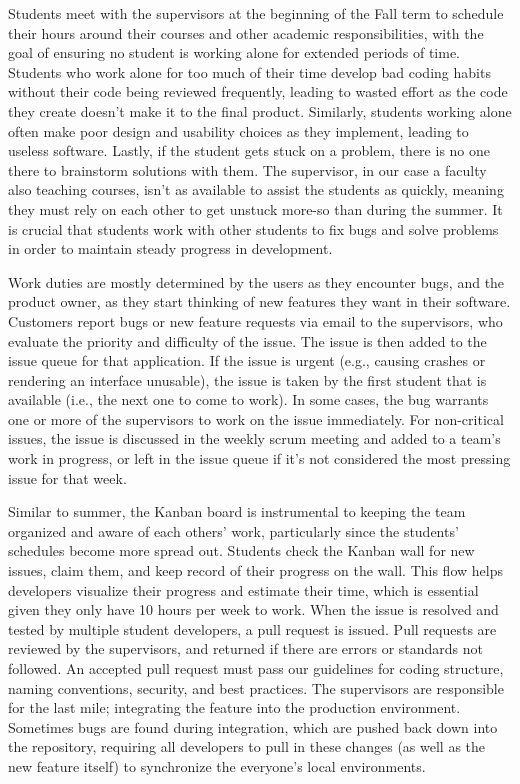 Students meet with the supervisors at the beginning of the Fall term to schedule their hours around their courses and other academic responsibilities, with the goal of ensuring no student is working alone for extended periods of time. Students who work alone for too much of their time develop bad coding habits without their code being reviewed frequently, leading to wasted effort as the code they create doesn't make it to the final product. Similarly, students working alone often make poor design and usability choices as they implement, leading to useless software. Lastly, if the student gets stuck on a problem, there is no one there to brainstorm solutions with them. The supervisor, in our case a faculty also teaching courses, isn't as available to assist the students as quickly, meaning they must rely on each other to get unstuck more-so than during the summer. It is crucial that students work with other students to fix bugs and solve problems in order to maintain steady progress in development.

Work duties are mostly determined by the users as they encounter bugs, and the product owner, as they start thinking of new features they want in their software. Customers report bugs or new feature requests via email to the supervisors, who evaluate the priority and difficulty of the issue. The issue is then added to the issue queue for that application. If the issue is urgent (e.g., causing crashes or rendering an interface unusable), the issue is taken by the first student that is available (i.e., the next one to come to work). In some cases, the bug warrants one or more of the supervisors to work on the issue immediately. For non-critical issues, the issue is discussed in the weekly scrum meeting and added to a team's work in progress, or left in the issue queue if it's not considered the most pressing issue for that week. 

Similar to summer, the Kanban board is instrumental to keeping the team organized and aware of each others' work, particularly since the students' schedules become more spread out. Students check the Kanban wall for new issues, claim them, and keep record of their progress on the wall. This flow helps developers visualize their progress and estimate their time, which is essential given they only have 10 hours per week to work. When the issue is resolved and tested by multiple student developers, a pull request is issued. Pull requests are reviewed by the supervisors, and returned if there are errors or standards not followed. An accepted pull request must pass our guidelines for coding structure, naming conventions, security, and best practices. The supervisors are responsible for the last mile; integrating the feature into the production environment. Sometimes bugs are found during integration, which are pushed back down into the repository, requiring all developers to pull in these changes (as well as the new feature itself) to synchronize the everyone's local environments. 

